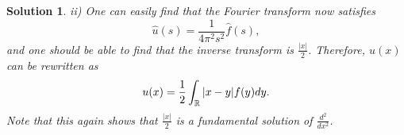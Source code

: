 \documentclass[6pt]{article}
\newtheorem{solution}{Solution}
\numberwithin{equation}{section}
\def\mathbb{\Bbb}
\begin{document}
\begin{enumerate}
\begin{solution}
ii) One can easily find that the Fourier transform now satisfies
\[\hat u(s)=\frac{1}{4\pi^2 s^2}\hat f(s),\]
and one should be able to find that the inverse transform is $\frac{|x|}{2}$.  Therefore, $u(x)$ can be rewritten as 
\[u(x)=\frac{1}{2}\int_{\mathbb R}|x-y|f(y)dy.\]  
Note that this again shows that $\frac{|x|}{2}$ is a fundamental solution of $\frac{d^2}{dx^2}$.

\end{solution}

\end{enumerate}
\end{document}
